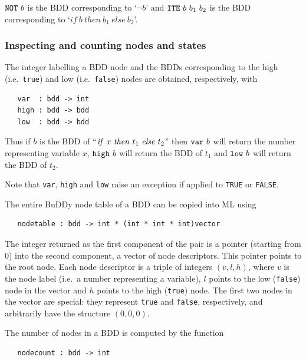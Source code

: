 \documentclass[12pt,fleqn]{book}
\renewcommand{\t}[1]{\mbox{\tt #1}}
\newcommand{\Buddy}{BuDDy{}}
\begin{document}
$\t{NOT}~b$ is the BDD corresponding to  `$\neg b$' and $\t{ITE}~b~b_1~b_2$ is the BDD corresponding
to `$if~b~then~b_1~else~b_2$'.




\subsubsection{Inspecting and counting nodes and states}

The integer labelling a BDD node and the BDDs corresponding to the high
(i.e.~{\t{true}}) and low (i.e.~{\t{false}}) nodes are obtained,
respectively, with

\begin{verbatim}
   var  : bdd -> int
   high : bdd -> bdd
   low  : bdd -> bdd
\end{verbatim}

Thus if $b$ is the BDD of ``${\it{if}}~x~{\it{then}}~t_1~{\it{else}}~t_2$''
then $\t{var}~b$ will return the number representing variable $x$,
$\t{high}~b$ will return the BDD of $t_1$ and $\t{low}~b$ will return
the BDD of $t_2$.

Note that \t{var}, \t{high} and \t{low} raise an exception if applied
to \t{TRUE} or \t{FALSE}.

The entire \Buddy{} node table of a BDD can be copied into ML using

\begin{verbatim}
   nodetable : bdd -> int * (int * int * int)vector
\end{verbatim}

The integer returned as the first component of the pair is a pointer
(starting from 0) into the second component, a vector of node
descriptors. This pointer points to the root node. Each node
descriptor is a triple of integers $(v,l,h)$, where $v$ is the node
label (i.e.~a number representing a variable), $l$ points to the low
({\t{false}}) node in the vector and $h$ points to the high
({\t{true}}) node. The first two nodes in the vector are special:
they represent {\t{true}} and {\t{false}}, respectively, and arbitrarily have
the structure $(0,0,0)$.

The number of nodes in a BDD is computed by the function

\begin{verbatim}
   nodecount : bdd -> int
\end{verbatim}
\end{document}

